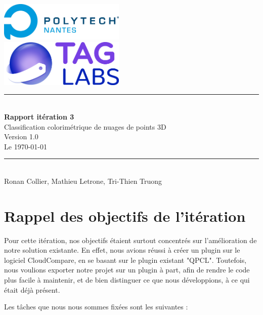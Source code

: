 \documentclass[12pt,titlepage,french]{article}
\begin{document}

\begin{titlepage}
\newcommand{\HRule}{\rule{\linewidth}{0.5mm}}
\center

  \includegraphics[width=0.45\textwidth]{../../ressources/img_logos/logo_polytech.png}\\[1cm]

  \includegraphics[width=0.45\textwidth]{../../ressources/img_logos/logo_taglabs.png}


\HRule \\[0.4cm]
{ \huge \bfseries Rapport itération 3\\[0.15cm] }
Classification colorimétrique de nuages de points 3D\\
Version 1.0\\
Le \today \\
\HRule \\[1.5cm]
Ronan Collier,
Mathieu Letrone,
Tri-Thien Truong
\\[1cm]
\end{titlepage}

\tableofcontents %
\newpage
\listoffigures  %
\newpage

\section{Rappel des objectifs de l'itération}
Pour cette itération, nos objectifs étaient surtout concentrés sur l'amélioration de notre solution existante. En effet, nous avions réussi à créer un plugin sur le logiciel CloudCompare, en se basant sur le plugin existant "QPCL". Toutefois, nous voulions exporter notre projet sur un plugin à part, afin de rendre le code plus facile à maintenir, et de bien distinguer ce que nous développions, à ce qui était déjà présent.

Les tâches que nous nous sommes fixées sont les suivantes :
\end{document}
